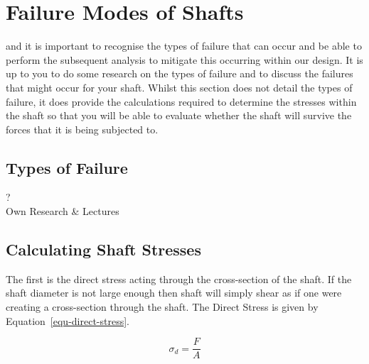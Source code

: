 \section{Failure Modes of Shafts}

 and it is important to recognise the types of failure that can occur and be able to perform the subsequent analysis to mitigate this occurring within our design. It is up to you to do some research on the types of failure and to discuss the failures that might occur for your shaft. Whilst this section does not detail the types of failure, it does provide the calculations required to determine the stresses within the shaft so that you will be able to evaluate whether the shaft will survive the forces that it is being subjected to.

\subsection{Types of Failure}

\begin{framed}
  \vspace{0.5cm}
    \begin{center}
      {\fontsize{50}{60}\selectfont ?}\\
      Own Research \& Lectures
    \end{center}
  \vspace{0.5cm}
\end{framed}





\subsection{Calculating Shaft Stresses}

 The first is the direct stress acting through the cross-section of the shaft. If the shaft diameter is not large enough then shaft will simply shear as if one were creating a cross-section through the shaft. The Direct Stress is given by Equation~\ref{equ-direct-stress}.

\begin{equation}
  \sigma_d = \frac{F}{A}
  \label{equ-direct-stress}
\end{equation}

